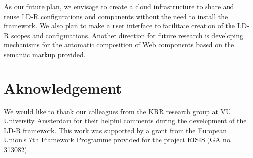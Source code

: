 \documentclass{acm_proc_article-sp}
\begin{document}
As our future plan, we envisage to create a cloud infrastructure to share and reuse LD-R configurations and components without the need to install the framework.
We also plan to make a user interface to facilitate creation of the LD-R scopes and configurations.
Another direction for future research is developing mechanisms for the automatic composition of Web components based on the semantic markup provided.


\section{Aknowledgement}
We would like to thank our colleagues from the KRR research group at VU University Amsterdam for their helpful comments during the development of the LD-R framework. This work was supported by a grant from the European Union's 7th Framework Programme provided for the project RISIS (GA no. 313082).



\end{document}
